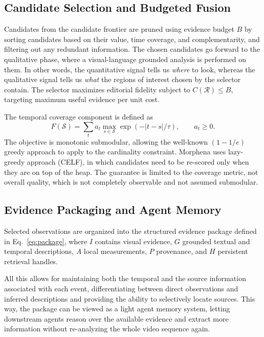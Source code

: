 \documentclass[conference]{IEEEtran}
\begin{document}
\subsection{Candidate Selection and Budgeted Fusion}
\label{sec:submodularity}

Candidates from the candidate frontier are pruned using evidence budget $B$ by sorting candidates based on their value, time coverage, and complementarity, and filtering out any redundant information. The chosen candidates go forward to the qualitative phase, where a visual-language grounded analysis is performed on them. In other words, the quantitative signal tells us \textit{where} to look, whereas the qualitative signal tells us \textit{what} the regions of interest chosen by the selector contain. The selector maximizes editorial fidelity subject to $C(\mathcal{R})\leq B$, targeting maximum useful evidence per unit cost.

The temporal coverage component is defined as
\begin{equation}
F(\mathcal{S})=\sum_t a_t\max_{s\in\mathcal{S}}
\exp(-|t-s|/\tau),\qquad a_t\geq0.
\end{equation}
The objective is monotonic submodular, allowing the well-known $(1 - 1/e)$ greedy approach to apply to the cardinality constraint. Morphena uses lazy-greedy approach (CELF), in which candidates need to be re-scored only when they are on top of the heap. The guarantee is limited to the coverage metric, not overall quality, which is not completely observable and not assumed submodular.


\subsection{Evidence Packaging and Agent Memory}

Selected observations are organized into the structured evidence package defined in Eq.~\ref{eq:package}, where $I$ contains visual evidence, $G$ grounded textual and temporal descriptions, $A$ local measurements, $P$ provenance, and $H$ persistent retrieval handles.

All this allows for maintaining both the temporal and the source information associated with each event, differentiating between direct observations and inferred descriptions and providing the ability to selectively locate sources. This way, the package can be viewed as a light agent memory system, letting downstream agents reason over the available evidence and extract more information without re-analyzing the whole video sequence again.
\end{document}
